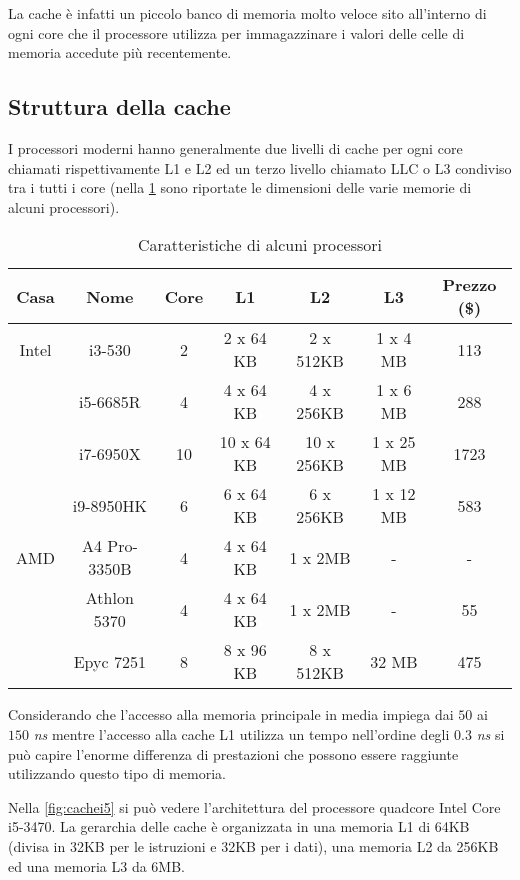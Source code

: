 		La cache è infatti un piccolo banco di memoria molto veloce sito all'interno di ogni core che il processore utilizza per immagazzinare i valori delle celle di memoria accedute più recentemente. 
		
		\subsection{Struttura della cache}
			I processori moderni hanno generalmente due livelli di cache per ogni core chiamati rispettivamente L1 e L2 ed un terzo livello chiamato \ac{LLC} o L3 condiviso tra i tutti i core (nella \cref{tab:processori} sono riportate le dimensioni delle varie memorie di alcuni processori). 
			
			\begin{table}[]
				\footnotesize
				\centering
				\begin{tabular}{|c|c|c|c|c|c|c|} \hline
					Casa		& Nome			& Core	& L1			& L2			& L3		& Prezzo (\$)	\\ \hline \hline
					Intel		& i3-530		& 2		& 2 x 64 KB		& 2 x 512KB		& 1 x 4 MB	& 113			\\ \hline
								& i5-6685R		& 4		& 4 x 64 KB		& 4 x 256KB		& 1 x 6 MB	& 288			\\ \hline
								& i7-6950X		& 10	& 10 x 64 KB	& 10 x 256KB	& 1 x 25 MB	& 1723			\\ \hline
								& i9-8950HK		& 6		& 6 x 64 KB		& 6 x 256KB		& 1 x 12 MB	& 583			\\ \hline
					AMD			& A4 Pro-3350B	& 4		& 4 x 64 KB		& 1 x 2MB		& -			& -				\\ \hline
								& Athlon 5370	& 4		& 4 x 64 KB		& 1 x 2MB		& -			& 55			\\ \hline
								& Epyc 7251		& 8		& 8 x 96 KB		& 8 x 512KB		& 32 MB		& 475			\\ \hline
				\end{tabular}
				\caption{Caratteristiche di alcuni processori}
				\label{tab:processori}
			\end{table}
			
			Considerando che l'accesso alla memoria principale in media impiega dai $50$ ai $150$ \emph{ns} mentre l'accesso alla cache L1 utilizza un tempo nell'ordine degli $0.3$ \emph{ns} si può capire l'enorme differenza di prestazioni che possono essere raggiunte utilizzando questo tipo di memoria.
		
			Nella \cref{fig:cachei5} si può vedere l'architettura del processore quadcore Intel Core i5-3470. La gerarchia delle cache è organizzata in una memoria L1 di 64KB (divisa in 32KB per le istruzioni e 32KB per i dati), una memoria L2 da 256KB ed una memoria L3 da 6MB.
			

